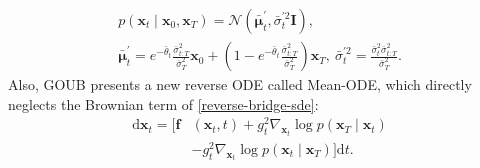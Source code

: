 \begin{equation}\label{gou_transition}
\begin{gathered}
p(\mathbf{x}_t\mid\mathbf{x}_0,\mathbf{x}_T)=\mathcal{N}(\bar{\boldsymbol{\mu}}_{t}^{\prime},\bar{\sigma}_t^{\prime2}\mathbf{I}), \\
\bar{\boldsymbol{\mu}}_{t}^{\prime}=e^{-\bar{\theta}_t}\frac{\bar{\sigma}_{t:T}^2}{\bar{\sigma}_T^2}\mathbf{x}_0 + ( 1 - e^{-\bar{\theta}_t}\frac{\bar{\sigma}_{t:T}^2}{\bar{\sigma}_T^2} )\mathbf{x}_T, \ \bar{\sigma}_t^{\prime2}=\frac{\bar{\sigma}_t^2\bar{\sigma}_{t:T}^2}{\bar{\sigma}_T^2}.
\end{gathered}
\end{equation}
Also, GOUB presents a new reverse ODE called Mean-ODE, which directly neglects the Brownian term of \eqref{reverse-bridge-sde}: 
\begin{equation}\label{reverse-mean-ode}
\begin{aligned}
\mathrm{d} \mathbf{x}_t = \Big[ \mathbf{f}&(\mathbf{x}_t, t) + g^2_t \nabla_{\mathbf{x}_t} \log p(\mathbf{x}_T \mid \mathbf{x}_t) \\
& - g_t^2\nabla_{\mathbf{x}_t} \log p(\mathbf{x}_t \mid \mathbf{x}_T) \Big] \mathrm{d} t.
\end{aligned}
\end{equation}

\vspace{-5mm}
